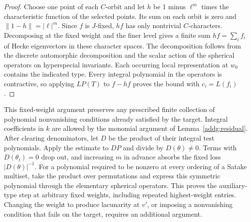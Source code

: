 \begin{proof}
Choose one point of each \(C\)-orbit and let \(h\) be 1 minus
\(\ell^m\) times the characteristic function of the selected points.
Its sum on each orbit is zero and \(\|1-h\|=|\ell|^m\).
Since \(f\) is \(J\)-fixed, \(hf\) has only nontrivial
\(C\)-characters. Decomposing at the fixed weight and the finer
level gives a finite sum \(hf=\sum_i f_i\) of Hecke eigenvectors
in these character spaces. The decomposition follows from the
discrete automorphic decomposition and the scalar action of the
spherical operators on hyperspecial invariants. Each occurring
local representation at \(w_0\) contains the indicated type.
Every integral polynomial in the operators is contractive, so applying
\(L P(T)\) to \(f-hf\) proves the bound with \(c_i=L(f_i)\).
\end{proof}

This fixed-weight argument preserves any prescribed finite collection
of polynomial nonvanishing conditions already satisfied by the target.
Integral coefficients in \(k\) are allowed by the monomial argument of
Lemma~\ref{addg:residual}. After clearing denominators, let \(D\) be the product
of their integral test polynomials. Apply the estimate to \(DP\)
and divide by \(D(\theta)\ne0\). Terms with \(D(\theta_i)=0\)
drop out, and increasing \(m\) in advance absorbs the fixed loss
\(|D(\theta)|^{-1}\). For a polynomial required to be nonzero at
every ordering of a Satake multiset, take the product over permutations and express this
symmetric polynomial through the elementary spherical operators.
This proves the auxiliary-type step at arbitrary fixed weights,
including repeated highest-weight entries. Changing the weight to
produce lacunarity at \(v'\), or imposing a nonvanishing condition
that fails on the target, requires an additional argument.
